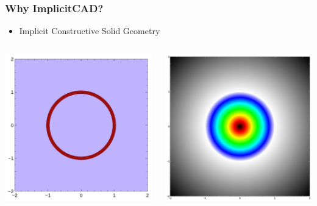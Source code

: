 \documentclass{beamer}
\begin{document}
\begin{frame}
  \frametitle{Why ImplicitCAD?}
\begin{itemize}
\item Implicit Constructive Solid Geometry
\end{itemize}
\begin{columns}
  \begin{column}{0.5\textwidth}
    \includegraphics[width=1.0\textwidth, left]{normal_circle.jpg}
  \end{column}
  \begin{column}{0.5\textwidth}
    \includegraphics[width=1.0\textwidth, right]{implicit_circle.jpg}
  \end{column}
\end{columns}
\end{frame}
\end{document}
